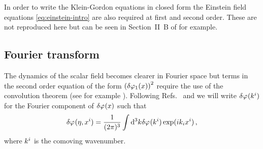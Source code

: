 In order to write the Klein-Gordon equations in closed form the Einstein field
equations \eqref{eq:einstein-intro} are also required at first and second order.
These are not reproduced here but can be seen in Section~II~B of
 for example. 

\subsection{Fourier transform}
\label{sec:fourier-perts}
% 
The dynamics of the scalar field becomes clearer in Fourier space but terms in
the second order equation of the form $\left(\delta\varphi_{1}(x)\right)^2$ require the use
of the convolution theorem (see for example ).
Following Refs.~\cite{Malik:2006ir} and \cite{book:liddle} we will write
$\delta\varphi_{}(k^i)$
for the Fourier component of $\delta\varphi_{}(x)$ such that
% 
\begin{equation}
 \delta\varphi_{}(\eta, x^i) = \frac{1}{(2 \pi)^3} \int \mathrm{d}^3k \delta\varphi_{}(k^i) \exp (i k_i
x^i)
\,,
\end{equation}
% 
where $k^i$ is the comoving wavenumber.


